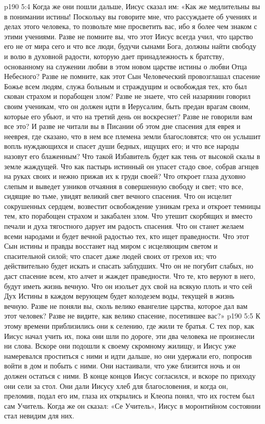 \vs p190 5:4 Когда же они пошли дальше, Иисус сказал им: «Как же медлительны вы в понимании истины! Поскольку вы говорите мне, что рассуждаете об учениях и делах этого человека, то позвольте мне просветить вас, ибо я более чем знаком с этими учениями. Разве не помните вы, что этот Иисус всегда учил, что царство его не от мира сего и что все люди, будучи сынами Бога, должны найти свободу и волю в духовной радости, которую дает принадлежность к братству, основанному на служении любви в этом новом царстве истины о любви Отца Небесного? Разве не помните, как этот Сын Человеческий провозглашал спасение Божье всем людям, служа больным и страждущим и освобождая тех, кто был скован страхом и порабощен злом? Разве не знаете, что сей назарянин говорил своим ученикам, что он должен идти в Иерусалим, быть предан врагам своим, которые его убьют, и что на третий день он воскреснет? Разве не говорили вам все это? И разве не читали вы в Писании об этом дне спасения для еврея и нееврея, где сказано, что в нем все племена земли благословятся; что он услышит вопль нуждающихся и спасет души бедных, ищущих его; и что все народы назовут его блаженным? Что такой Избавитель будет как тень от высокой скалы в земле жаждущей. Что как пастырь истинный он упасет стадо свое, собрав агнцев на руках своих и нежно прижав их к груди своей? Что откроет глаза духовно слепым и выведет узников отчаяния в совершенную свободу и свет; что все, сидящие во тьме, увидят великий свет вечного спасения. Что он исцелит сокрушенных сердцем, возвестит освобождение узникам греха и откроет темницы тем, кто порабощен страхом и закабален злом. Что утешит скорбящих и вместо печали и духа тягостного дарует им радость спасения. Что он станет желаем всеми народами и будет вечной радостью тех, кто ищет праведности. Что этот Сын истины и правды восстанет над миром с исцеляющим светом и спасительной силой; что спасет даже людей своих от грехов их; что действительно будет искать и спасать заблудших. Что он не погубит слабых, но даст спасение всем, кто алчет и жаждет праведности. Что те, кто веруют в него, будут иметь жизнь вечную. Что он изольет дух свой на всякую плоть и что сей Дух Истины в каждом верующем будет колодезем воды, текущей в жизнь вечную. Разве не поняли вы, сколь велико евангелие царства, которое дал вам этот человек? Разве не видите, как велико спасение, посетившее вас?»
\vs p190 5:5 К этому времени приблизились они к селению, где жили те братья. С тех пор, как Иисус начал учить их, пока они шли по дороге, эти два человека не произнесли ни слова. Вскоре они подошли к своему скромному жилищу, и Иисус уже намеревался проститься с ними и идти дальше, но они удержали его, попросив войти в дом и побыть с ними. Они настаивали, что уже близится ночь и он должен остаться с ними. В конце концов Иисус согласился, и вскоре по приходу они сели за стол. Они дали Иисусу хлеб для благословения, и когда он, преломив, подал его им, глаза их открылись и Клеопа понял, что их гостем был сам Учитель. Когда же он сказал: «Се Учитель», Иисус в моронтийном состоянии стал невидим для них.
